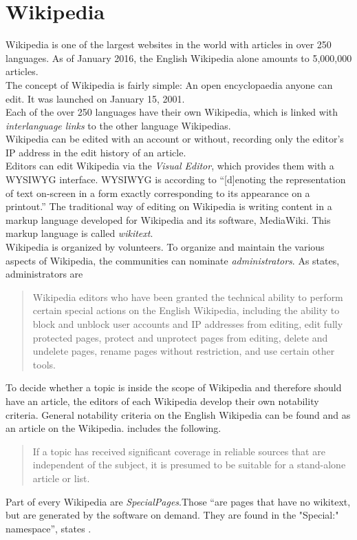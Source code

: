 \section{Wikipedia}
Wikipedia is one of the largest websites in the world with articles in over 250 languages. As of January 2016, the English Wikipedia alone amounts to 5,000,000 articles. \citep{wiki:32} \\
The concept of Wikipedia is fairly simple: An open encyclopaedia anyone can edit. It was launched on January 15, 2001. \citep{wiki:31} \\
Each of the over 250 languages have their own Wikipedia, which is linked with \textit{interlanguage links} to the other language Wikipedias. \\
Wikipedia can be edited with an account or without, recording only the editor's IP address in the edit history of an article. \\
Editors can edit Wikipedia via the \textit{Visual Editor}, which provides them with a WYSIWYG interface. WYSIWYG is according to \citet{wysiwyg} ``[d]enoting the representation of text on-screen in a form exactly corresponding to its appearance on a printout.'' The traditional way of editing on Wikipedia is writing content in a markup language developed for Wikipedia and its software, MediaWiki. This markup language is called \textit{wikitext}. \\
Wikipedia is organized by volunteers. To organize and maintain the various aspects of Wikipedia, the communities can nominate \textit{administrators}.
As \citet{wiki:10} states, administrators are
\begin{quote}
 Wikipedia editors who have been granted the technical ability to perform certain special actions on the English Wikipedia, including the ability to block and unblock user accounts and IP addresses from editing, edit fully protected pages, protect and unprotect pages from editing, delete and undelete pages, rename pages without restriction, and use certain other tools.
\end{quote}

To decide whether a topic is inside the scope of Wikipedia and therefore should have an article, the editors of each Wikipedia develop their own notability criteria. General notability criteria on the English Wikipedia can be found and as an article on the Wikipedia. \citet{wiki:11} includes the following. 
\begin{quote}
 If a topic has received significant coverage in reliable sources that are independent of the subject, it is presumed to be suitable for a stand-alone article or list.
\end{quote}

Part of every Wikipedia are \textit{SpecialPages}.Those ``are pages that have no wikitext, but are generated by the software on demand. They are found in the "Special:" namespace'', states \citet{wiki:12}.


